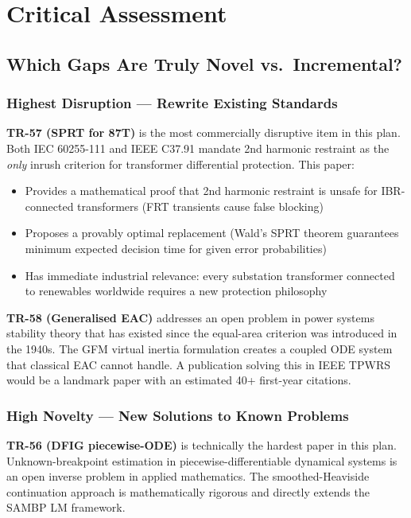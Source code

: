 \documentclass[12pt, a4paper]{report}
\begin{document}
\chapter{Critical Assessment}

\section{Which Gaps Are Truly Novel vs.\ Incremental?}

\subsection{Highest Disruption — Rewrite Existing Standards}

\textbf{TR-57 (SPRT for 87T)} is the most commercially disruptive item in this plan. Both IEC 60255-111 and IEEE C37.91 mandate 2nd harmonic restraint as the \textit{only} inrush criterion for transformer differential protection. This paper:
\begin{itemize}[nosep]
  \item Provides a mathematical proof that 2nd harmonic restraint is unsafe for IBR-connected transformers (FRT transients cause false blocking)
  \item Proposes a provably optimal replacement (Wald's SPRT theorem guarantees minimum expected decision time for given error probabilities)
  \item Has immediate industrial relevance: every substation transformer connected to renewables worldwide requires a new protection philosophy
\end{itemize}

\textbf{TR-58 (Generalised EAC)} addresses an open problem in power systems stability theory that has existed since the equal-area criterion was introduced in the 1940s. The GFM virtual inertia formulation creates a coupled ODE system that classical EAC cannot handle. A publication solving this in IEEE TPWRS would be a landmark paper with an estimated 40+ first-year citations.

\subsection{High Novelty — New Solutions to Known Problems}

\textbf{TR-56 (DFIG piecewise-ODE)} is technically the hardest paper in this plan. Unknown-breakpoint estimation in piecewise-differentiable dynamical systems is an open inverse problem in applied mathematics. The smoothed-Heaviside continuation approach is mathematically rigorous and directly extends the SAMBP LM framework.
\end{document}
